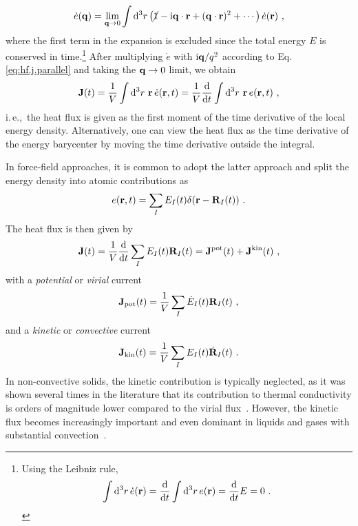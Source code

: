 \begin{align}
	\dot{e} (\b q) 
		= \lim_{\b q \to 0} \int \d^3 r \left(\cancel{1} - \im \b q \cdot \b r + (\b q \cdot \b r)^2 + \cdots \right) \dot{e} (\b r)~,
	\label{eq:hf.e.lw}
\end{align}
where the first term in the expansion is excluded since the total energy $E$ is conserved in time.\footnote{Using the  Leibniz rule,
\begin{align*}
	\int {\rm d}^3 r \, \dot{e} ({\bf r}) = \frac{{\rm d}}{{\rm d} t} \int {\rm d}^3 r \, e ({\bf r}) = \frac{{\rm d}}{{\rm d} t} E = 0~.
\end{align*}
}
After multiplying $\dot e$ with ${\rm i} {\bf q} / q^2$ according to Eq.\,\eqref{eq:hf.j.parallel} and taking the ${\bf q} \to 0$ limit, we obtain
\begin{align}
	\b J (t) 
		= \frac{1}{V} \int \d^3 r ~ \b r \, \dot{e} (\b r, t)
		= \frac{1}{V} \frac{\d}{\d t} \int \d^3 r ~ \b r \, e (\b r, t)
	~,
	\label{eq:hf.J}
\end{align}
i.\,e.,~the heat flux is given as the first moment of the time derivative of the local energy density. Alternatively, one can view the heat flux as the time derivative of the energy barycenter by moving the time derivative outside the integral.

In force-field approaches, it is common to adopt the latter approach and split the energy density into atomic contributions as
\begin{align}
	e (\b r, t ) = \sum_I E_I (t) \delta (\b r - \b R_I (t))~.
	\label{eq:hf.e.atomic}
\end{align}
The heat flux is then given by~\cite{Helfand1960}
\begin{align}
	\b J (t) 
		= \frac{1}{V} \frac{\d}{\d t} \sum_I E_I(t) \b R_I(t)
		= {\bf J}^{\rm pot} (t) + {\bf J}^{\rm kin} (t)~,
	\label{eq:hf.J.atomic}
\end{align}
with a \emph{potential} or \emph{virial} current
\begin{align}
	{\bf J}_{\rm pot} (t)
		= \frac{1}{V} \sum_I \dot{E}_I (t) \b R_I (t)~,
	\label{eq:J_pot}
\end{align}
and a \emph{kinetic} or \emph{convective} current
\begin{align}
	{\bf J}_{\rm kin} (t)
		= \frac{1}{V} \sum_I E_I (t) \dot{\b R}_I (t)~.
	\label{eq:J_kin}
\end{align}
In non-convective solids, the kinetic contribution is typically neglected, as it was shown several times in the literature that its contribution to thermal conductivity is orders of magnitude lower compared to the virial flux~\cite{Vogelsang1987,Kinaci2012}. However, the kinetic flux becomes increasingly important and even dominant in liquids and gases with substantial convection~\cite{Cheng2020}.

